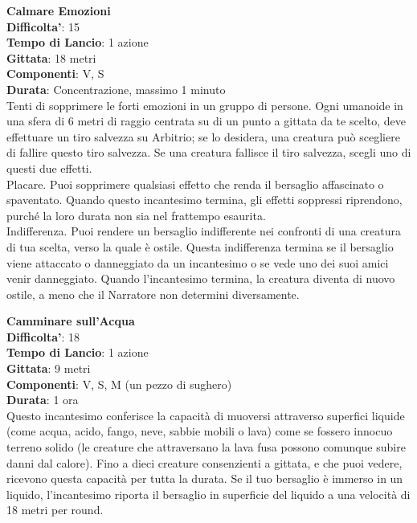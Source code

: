 \begin{multicols}{2}
\medskip\textbf{Calmare Emozioni}\\
\textbf{Difficolta'}: 15\\
\textbf{Tempo di Lancio}: 1 azione\\
\textbf{Gittata}: 18 metri\\
\textbf{Componenti}: V, S\\
\textbf{Durata}: Concentrazione, massimo 1 minuto\\
Tenti di sopprimere le forti emozioni in un gruppo di persone. Ogni umanoide in una sfera di 6 metri di raggio centrata su di un punto a gittata da te scelto, deve effettuare un tiro salvezza su Arbitrio; se lo  desidera, una creatura può scegliere di fallire questo tiro salvezza. Se una creatura fallisce il tiro salvezza, scegli uno di questi due effetti. \\
Placare. Puoi sopprimere qualsiasi effetto che renda il bersaglio affascinato o spaventato. Quando questo incantesimo termina, gli effetti soppressi riprendono, purché la loro durata non sia nel frattempo esaurita.\\
Indifferenza. Puoi rendere un bersaglio indifferente nei confronti di una creatura di tua scelta, verso la quale è ostile. Questa indifferenza termina se il bersaglio viene attaccato o danneggiato da un incantesimo o se vede uno dei suoi amici venir danneggiato. Quando l’incantesimo termina, la creatura diventa di nuovo ostile, a meno che il Narratore non determini diversamente.

\medskip\textbf{Camminare sull’Acqua}\\
\textbf{Difficolta'}: 18\\
\textbf{Tempo di Lancio}: 1 azione\\
\textbf{Gittata}: 9 metri\\
\textbf{Componenti}: V, S, M (un pezzo di sughero)\\
\textbf{Durata}: 1 ora\\
Questo incantesimo conferisce la capacità di muoversi attraverso superfici liquide (come acqua, acido, fango, neve, sabbie mobili o lava) come se fossero innocuo terreno solido (le creature che attraversano la lava fusa possono comunque subire danni dal calore). Fino a dieci creature consenzienti a gittata, e che puoi vedere, ricevono questa capacità per tutta la durata. Se il tuo bersaglio è immerso in un liquido, l’incantesimo riporta il bersaglio in superficie del liquido a una velocità di 18 metri per round. 


\end{multicols}

